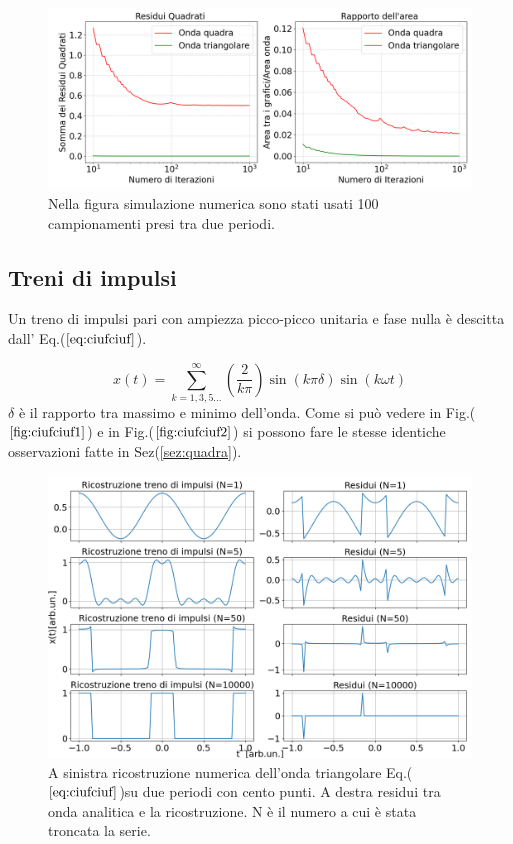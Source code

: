 \documentclass{article}
\begin{document}
      

        \begin{figure}[H]
            \centering
            \includegraphics[width=1\textwidth]{residuals2.png} %
            \caption{Nella figura simulazione numerica sono stati usati 100 campionamenti presi tra due periodi.}
            \label{fig:res2}
        \end{figure}

    \subsection{Treni di impulsi}
    Un treno di impulsi pari con ampiezza picco-picco unitaria e fase nulla è descitta
    dall' Eq.($\ref{eq:ciufciuf}$).

    \begin{equation}
        x(t) = \sum_{k=1,3,5...}^{\infty} \left(\frac{2}{k\pi}\right)\sin\left(k\pi\delta\right)\sin\left(k\omega t\right)
        \label{eq:ciufciuf}
    \end{equation}
    $\delta$ è il rapporto tra massimo e minimo dell'onda.
    Come si può vedere in Fig.($\ref{fig:ciufciuf1} $) e in Fig.($\ref{fig:ciufciuf2} $)
    si possono fare le stesse identiche osservazioni fatte in Sez(\ref{sez:quadra}).
    \begin{figure}[H]
        \centering
        \includegraphics[width=1\textwidth]{foupulsetrainwave1e2.png} %
        \caption{A sinistra ricostruzione numerica dell'onda triangolare
        Eq.($\ref{eq:ciufciuf}$)su due periodi con cento punti.
        A destra residui tra onda analitica e la ricostruzione.
        N è il numero a cui è stata troncata la serie. }
        \label{fig:ciufciuf1}
    \end{figure}
\end{document}
